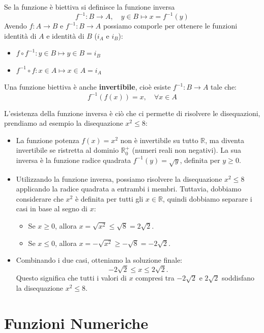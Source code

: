 \documentclass[oneside,10pt]{book} %
\begin{document}
Se la funzione è biettiva si definisce la funzione inversa
\[
f^{-1}: B \to A, \quad y \in B \mapsto x = f^{-1}(y)
\]
Avendo $f: A \to B$ e $f^{-1}: B \to A$ possiamo comporle per ottenere le funzioni identità di $A$ e identità di $B$ ($i_A$ e $i_B$):
\begin{itemize}
    \item $f \circ f^{-1}: y \in B \mapsto y \in B = i_B$
    \item $f^{-1} \circ f: x \in A \mapsto x \in A = i_A$
\end{itemize}

Una funzione biettiva è anche \textbf{invertibile}, cioè esiste $f^{-1}: B \to A$ tale che:
\[
f^{-1}(f(x)) = x, \quad \forall x \in A
\]

L'esistenza della funzione inversa è ciò che ci permette di risolvere le disequazioni, prendiamo ad esempio la disequazione $x^2 \leq 8$:
\begin{itemize}
    \item La funzione potenza $f(x) = x^2$ non è invertibile su tutto $\mathbb{R}$, ma diventa invertibile se ristretta al dominio $\mathbb{R}^+_0$ (numeri reali non negativi). La sua inversa è la funzione radice quadrata $f^{-1}(y) = \sqrt{y}$, definita per $y \geq 0$.

    \item Utilizzando la funzione inversa, possiamo risolvere la disequazione $x^2 \leq 8$ applicando la radice quadrata a entrambi i membri. Tuttavia, dobbiamo considerare che $x^2$ è definita per tutti gli $x \in \mathbb{R}$, quindi dobbiamo separare i casi in base al segno di $x$:
    \begin{itemize}
        \item Se $x \geq 0$, allora $x = \sqrt{x^2} \leq \sqrt{8} = 2\sqrt{2}$.
        \item Se $x \leq 0$, allora $x = -\sqrt{x^2} \geq -\sqrt{8} = -2\sqrt{2}$.
    \end{itemize}

    \item Combinando i due casi, otteniamo la soluzione finale:
    \[
    -2\sqrt{2} \leq x \leq 2\sqrt{2}.
    \]
    Questo significa che tutti i valori di $x$ compresi tra $-2\sqrt{2}$ e $2\sqrt{2}$ soddisfano la disequazione $x^2 \leq 8$.
  \end{itemize}

\section{Funzioni Numeriche}
\end{document}
